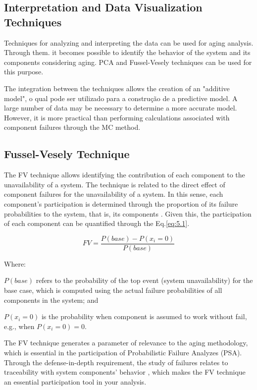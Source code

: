 \documentclass{ws-m3as}
\begin{document}
\subsection{Interpretation and Data Visualization Techniques}
Techniques for analyzing and interpreting the data can be used for aging analysis. Through them. it becomes possible to identify the behavior of the system and its components considering aging. PCA and Fussel-Vesely techniques can be used for this purpose. 

The integration between the techniques allows the creation of an "additive model", o qual pode ser utilizado para a construção de a predictive model. A large number of data may be necessary to determine a more accurate model. However, it is more practical than performing calculations associated with component failures through the MC method.

\subsection{Fussel-Vesely Technique} 

The FV technique allows identifying the contribution of each component to the unavailability of a system. The technique is related to the direct effect of component failures for the unavailability of a system. In this sense, each component's participation is determined through the proportion of its failure probabilities to the system, that is, its components \cite{Shadiah2019}. Given this, the participation of each component can be quantified through the Eq.\ref{eq:5.1}.

\begin{equation} \label{eq:5.1}
FV=\frac{P(base)-P(x_{i}=0)}{P(base)}
\end{equation}

Where:

\begin{itemlist}
	\item $P(base)$ refers to the probability of the top event (system unavailability) for the base case, which is computed using the actual failure probabilities of all components in the system; and
	\item $P(x_{i}=0)$ is the probability when component is assumed to work without fail, e.g., when $P(x_{i}=0)=0$.
\end{itemlist}

The FV technique generates a parameter of relevance to the aging methodology, which is essential in the participation of Probabilistic Failure Analyzes (PSA). Through the defense-in-depth requirement, the study of failures relates to traceability with system components' behavior \cite{vanderBorst2001}, which makes the FV technique an essential participation tool in your analysis.
\end{document}
